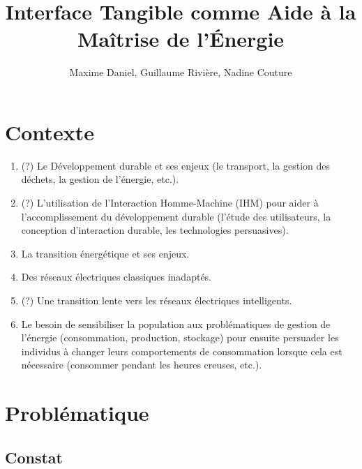 \documentclass[10pt,a5paper,twoside]{article}
\title{Interface Tangible comme Aide à la Maîtrise de l'Énergie}
\author{Maxime Daniel, Guillaume Rivière, Nadine Couture}
\begin{document}
\maketitle
{}

\section{Contexte}\label{contexte}

\begin{enumerate}
\def\labelenumi{\arabic{enumi}.}
\itemsep1pt\parskip0pt
\item
  (?) Le Développement durable et ses enjeux (le transport, la gestion
  des déchets, la gestion de l'énergie, etc.).
\item
  (?) L'utilisation de l'Interaction Homme-Machine (IHM) pour aider à
  l'accomplissement du développement durable (l'étude des utilisateurs,
  la conception d'interaction durable, les technologies persuasives).
\item
  La transition énergétique et ses enjeux.
\item
  Des réseaux électriques classiques inadaptés.
\item
  (?) Une transition lente vers les réseaux électriques intelligents.
\item
  Le besoin de sensibiliser la population aux problématiques de gestion
  de l'énergie (consommation, production, stockage) pour ensuite
  persuader les individus à changer leurs comportements de consommation
  lorsque cela est nécessaire (consommer pendant les heures creuses,
  etc.).
\end{enumerate}

\section{Problématique}\label{probluxe9matique}

\subsection{Constat}\label{constat}
\end{document}

